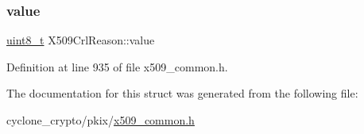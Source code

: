 \mbox{\label{structX509CrlReason_aeb0b8a221c1871f8faab552f92f66cd7}} 
\subsubsection{\texorpdfstring{value}{value}}
{\footnotesize\ttfamily \hyperlink{stdint_8h_aba7bc1797add20fe3efdf37ced1182c5}{uint8\+\_\+t} X509\+Crl\+Reason\+::value}



Definition at line 935 of file x509\+\_\+common.\+h.



The documentation for this struct was generated from the following file\+:\begin{DoxyCompactItemize}
\item 
cyclone\+\_\+crypto/pkix/\hyperlink{pkix_2x509__common_8h}{x509\+\_\+common.\+h}\end{DoxyCompactItemize}
